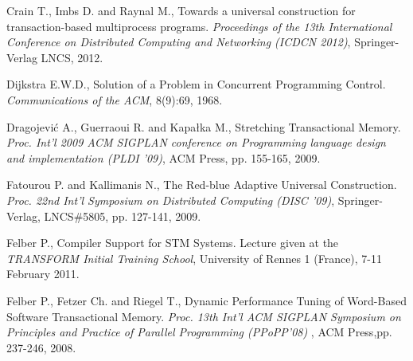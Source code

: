\begin{thebibliography}{99}
{
Crain T., Imbs D. and Raynal M.,
Towards a universal construction for transaction-based multiprocess programs.
{\it Proceedings of the 13th International Conference on Distributed Computing and Networking (ICDCN 2012)}, 
Springer-Verlag LNCS, 2012.



Dijkstra E.W.D., 
Solution of a Problem in Concurrent Programming Control.
{\it  Communications of the  ACM}, 8(9):69, 1968.


Dragojevi\'{c} A., Guerraoui R. and  Kapa\l{}ka M., 
Stretching Transactional Memory. 
{\it  Proc. Int'l  2009 ACM SIGPLAN conference on Programming
 language design and implementation (PLDI '09)},  
ACM Press, pp. 155-165,  2009. 


Fatourou P. and Kallimanis N., 
The Red-blue Adaptive Universal Construction. 
{\it  Proc. 22nd  Int'l  Symposium on Distributed Computing
(DISC '09)},  Springer-Verlag, LNCS\#5805, pp. 127-141,  2009. 




Felber P., 
Compiler Support for STM Systems. 
Lecture given at the  {\it TRANSFORM  Initial Training School},  University
of Rennes  1 (France), 7-11 February 2011. 




Felber P.,  Fetzer Ch. and  Riegel T., 
Dynamic Performance Tuning of Word-Based Software Transactional Memory. 
{\it  Proc. 13th  Int'l  ACM SIGPLAN Symposium on Principles and
 Practice of Parallel Programming (PPoPP'08) },  ACM Press,pp. 237-246,  2008. 

}
\end{thebibliography}
